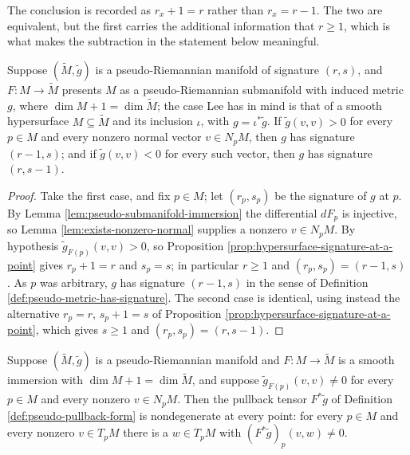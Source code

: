 The conclusion is recorded as $r_x + 1 = r$ rather than $r_x = r - 1$. The two are equivalent, but the first carries the additional information that $r \geq 1$, which is what makes the subtraction in the statement below meaningful.

\begin{proposition}
\label{prop:pseudo-riemannian-hypersurface-signature}
\leanok
{}
Suppose $(\tilde{M}, \tilde{g})$ is a pseudo-Riemannian manifold of signature $(r,s)$, and $F : M \to \tilde{M}$ presents $M$ as a pseudo-Riemannian submanifold with induced metric $g$, where $\dim M + 1 = \dim\tilde{M}$; the case Lee has in mind is that of a smooth hypersurface $M \subseteq \tilde{M}$ and its inclusion $\iota$, with $g = \iota^*\tilde{g}$. If $\tilde{g}(v,v) > 0$ for every $p \in M$ and every nonzero normal vector $v \in N_pM$, then $g$ has signature $(r-1,s)$; and if $\tilde{g}(v,v) < 0$ for every such vector, then $g$ has signature $(r,s-1)$.
\end{proposition}

\begin{proof}
\leanok
{}
Take the first case, and fix $p \in M$; let $(r_p,s_p)$ be the signature of $g$ at $p$. By Lemma \ref{lem:pseudo-submanifold-immersion} the differential $dF_p$ is injective, so Lemma \ref{lem:exists-nonzero-normal} supplies a nonzero $v \in N_pM$. By hypothesis $\tilde{g}_{F(p)}(v,v) > 0$, so Proposition \ref{prop:hypersurface-signature-at-a-point} gives $r_p + 1 = r$ and $s_p = s$; in particular $r \geq 1$ and $(r_p,s_p) = (r-1,s)$. As $p$ was arbitrary, $g$ has signature $(r-1,s)$ in the sense of Definition \ref{def:pseudo-metric-has-signature}. The second case is identical, using instead the alternative $r_p = r$, $s_p + 1 = s$ of Proposition \ref{prop:hypersurface-signature-at-a-point}, which gives $s \geq 1$ and $(r_p,s_p) = (r,s-1)$.
\end{proof}

\begin{lemma}
\label{lem:pseudo-hypersurface-induced-tensor-nondegenerate}
\leanok
{}
Suppose $(\tilde{M},\tilde{g})$ is a pseudo-Riemannian manifold and $F : M \to \tilde{M}$ is a smooth immersion with $\dim M + 1 = \dim\tilde{M}$, and suppose $\tilde{g}_{F(p)}(v,v) \neq 0$ for every $p \in M$ and every nonzero $v \in N_pM$. Then the pullback tensor $F^*\tilde{g}$ of Definition \ref{def:pseudo-pullback-form} is nondegenerate at every point: for every $p \in M$ and every nonzero $v \in T_pM$ there is a $w \in T_pM$ with $(F^*\tilde{g})_p(v,w) \neq 0$.
\end{lemma}

